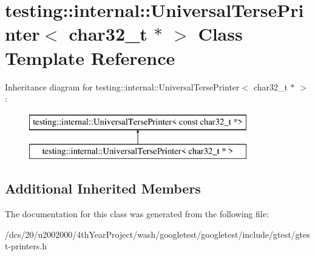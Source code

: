 \hypertarget{classtesting_1_1internal_1_1UniversalTersePrinter_3_01char32__t_01_5_01_4}{}\section{testing\+:\+:internal\+:\+:Universal\+Terse\+Printer$<$ char32\+\_\+t $\ast$ $>$ Class Template Reference}
\label{classtesting_1_1internal_1_1UniversalTersePrinter_3_01char32__t_01_5_01_4}
Inheritance diagram for testing\+:\+:internal\+:\+:Universal\+Terse\+Printer$<$ char32\+\_\+t $\ast$ $>$\+:\begin{figure}[H]
\begin{center}
\leavevmode
\includegraphics[height=2.000000cm]{classtesting_1_1internal_1_1UniversalTersePrinter_3_01char32__t_01_5_01_4}
\end{center}
\end{figure}
\subsection*{Additional Inherited Members}


The documentation for this class was generated from the following file\+:\begin{DoxyCompactItemize}
\item 
/dcs/20/u2002000/4th\+Year\+Project/wash/googletest/googletest/include/gtest/gtest-\/printers.\+h\end{DoxyCompactItemize}
